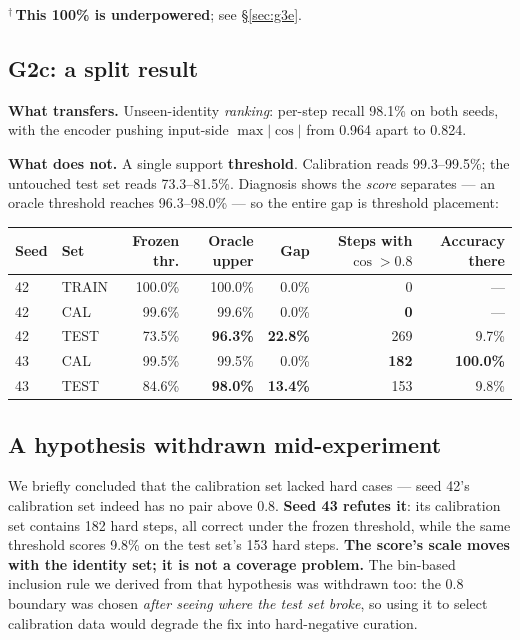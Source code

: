 \documentclass[11pt, a4paper]{article}
\begin{document}
$^\dagger$\,\textbf{This 100\% is underpowered}; see \S\ref{sec:g3e}.

\subsection{G2c: a split result}\label{sec:g2c}

\textbf{What transfers.} Unseen-identity \emph{ranking}: per-step recall 98.1\% on both
seeds, with the encoder pushing input-side $\max|\cos|$ from 0.964 apart to 0.824.

\textbf{What does not.} A single support \textbf{threshold}. Calibration reads
99.3--99.5\%; the untouched test set reads 73.3--81.5\%. Diagnosis shows the \emph{score}
separates --- an oracle threshold reaches 96.3--98.0\% --- so the entire gap is threshold
placement:

\begin{table}[h]
\centering\small
\begin{tabular}{llrrrrr}
\toprule
Seed & Set & Frozen thr. & Oracle upper & Gap & Steps with $\cos>0.8$ & Accuracy there \\
\midrule
42 & TRAIN & 100.0\% & 100.0\% & 0.0\% & 0 & --- \\
42 & CAL & 99.6\% & 99.6\% & 0.0\% & \textbf{0} & --- \\
42 & TEST & 73.5\% & \textbf{96.3\%} & \textbf{22.8\%} & 269 & 9.7\% \\
43 & CAL & 99.5\% & 99.5\% & 0.0\% & \textbf{182} & \textbf{100.0\%} \\
43 & TEST & 84.6\% & \textbf{98.0\%} & \textbf{13.4\%} & 153 & 9.8\% \\
\bottomrule
\end{tabular}
\end{table}

\subsection{A hypothesis withdrawn mid-experiment}

We briefly concluded that the calibration set lacked hard cases --- seed 42's calibration
set indeed has no pair above 0.8. \textbf{Seed 43 refutes it}: its calibration set
contains 182 hard steps, all correct under the frozen threshold, while the same threshold
scores 9.8\% on the test set's 153 hard steps. \textbf{The score's scale moves with the
identity set; it is not a coverage problem.} The bin-based inclusion rule we derived from
that hypothesis was withdrawn too: the 0.8 boundary was chosen \emph{after seeing where
the test set broke}, so using it to select calibration data would degrade the fix into
hard-negative curation.
\end{document}
